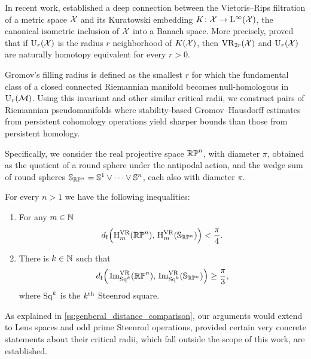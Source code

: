 \medskip In recent work, \cite{lim2024vietoris} established a deep connection between the Vietoris--Rips filtration of a metric space \(\mathcal{X}\) and its Kuratowski embedding \(K \colon \mathcal{X} \to \mathrm{L}^\infty(\mathcal{X})\), the canonical isometric inclusion of \(\mathcal{X}\) into a Banach space.
More precisely, \cite{lim2024vietoris} proved that if \(\mathrm{U}_r(\mathcal{X})\) is the radius \(r\) neighborhood of \(K(\mathcal{X})\), then \(\mathrm{VR}_{2r}(\mathcal{X})\) and \(\mathrm{U}_r(\mathcal{X})\) are naturally homotopy equivalent for every \(r > 0\).

Gromov's filling radius is defined as the smallest \(r\) for which the fundamental class of a closed connected Riemannian manifold becomes null-homologous in \(\mathrm{U}_r(\mathcal{M})\).
Using this invariant and other similar critical radii, we construct pairs of Riemannian pseudomanifolds where stability-based Gromov--Hausdorff estimates from persistent cohomology operations yield sharper bounds than those from persistent homology.

Specifically, we consider the real projective space \(\mathbb{RP}^n\), with diameter \(\pi\), obtained as the quotient of a round sphere under the antipodal action, and the wedge sum of round spheres \(\mathbb{S}_{\mathbb{RP}^n} = \mathbb{S}^1 \vee \dots \vee \mathbb{S}^n\), each also with diameter \(\pi\).

\theorem
For every \(n > 1\) we have the following inequalities:
\begin{enumerate}
	\item For any \(m \in \mathbb{N}\)
	\[
	d_{\mathrm{I}}\Big(\mathrm{H}^{\mathrm{VR}}_m(\mathbb{RP}^n),\, \mathrm{H}^{\mathrm{VR}}_m(\mathbb{S}_{\mathbb{RP}^n})\Big) < \frac{\pi}{4}.
	\]

	\item There is \(k \in \mathbb{N}\) such that
	\[
	d_{\mathrm{I}}\Big(\operatorname{Im}_{\mathrm{Sq}^k}^{\mathrm{VR}}(\mathbb{RP}^n),\, \operatorname{Im}_{\mathrm{Sq}^k}^{\mathrm{VR}}(\mathbb{S}_{\mathbb{RP}^n})\Big) \geq \frac{\pi}{3},
	\]
	where \(\mathrm{Sq}^k\) is the \(k^{\mathrm{th}}\) Steenrod square.
\end{enumerate}

\medskip As explained in \cref{ss:genberal_distance_comparison}, our arguments would extend to Lens spaces and odd prime Steenrod operations, provided certain very concrete statements about their critical radii, which fall outside the scope of this work, are established.